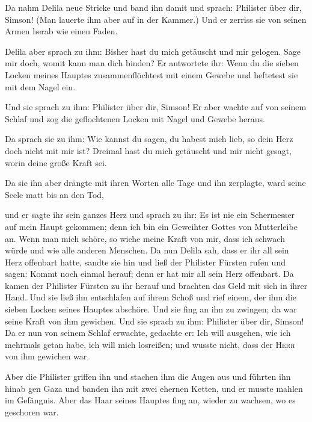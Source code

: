  Da nahm Delila neue Stricke und band ihn damit und
sprach: Philister über dir, Simson! (Man lauerte ihm aber auf in der
Kammer.) Und er zerriss sie von seinen Armen herab wie einen Faden.

 Delila aber sprach zu ihm: Bisher hast du mich getäuscht
und mir gelogen. Sage mir doch, womit kann man dich binden? Er
antwortete ihr: Wenn du die sieben Locken meines Hauptes
zusammenflöchtest mit einem Gewebe und heftetest sie mit dem Nagel ein.

 Und sie sprach zu ihm: Philister über dir, Simson! Er
aber wachte auf von seinem Schlaf und zog die geflochtenen Locken mit
Nagel und Gewebe heraus.

 Da sprach sie zu ihm: Wie kannst du sagen, du habest
mich lieb, so dein Herz doch nicht mit mir ist? Dreimal hast du mich
getäuscht und mir nicht gesagt, worin deine große Kraft sei.

 Da sie ihn aber drängte mit ihren Worten alle Tage und
ihn zerplagte, ward seine Seele matt bis an den Tod,

 und er sagte ihr sein ganzes Herz und sprach zu ihr: Es
ist nie ein Schermesser auf mein Haupt gekommen; denn ich bin ein
Geweihter Gottes von Mutterleibe an. Wenn man mich schöre, so wiche
meine Kraft von mir, dass ich schwach würde und wie alle anderen
Menschen.  Da nun Delila sah, dass er ihr all sein Herz
offenbart hatte, sandte sie hin und ließ der Philister Fürsten rufen und
sagen: Kommt noch einmal herauf; denn er hat mir all sein Herz
offenbart. Da kamen der Philister Fürsten zu ihr herauf und brachten das
Geld mit sich in ihrer Hand.  Und sie ließ ihn
entschlafen auf ihrem Schoß und rief einem, der ihm die sieben Locken
seines Hauptes abschöre. Und sie fing an ihn zu zwingen; da war seine
Kraft von ihm gewichen.  Und sie sprach zu ihm: Philister
über dir, Simson! Da er nun von seinem Schlaf erwachte, gedachte er: Ich
will ausgehen, wie ich mehrmals getan habe, ich will mich losreißen; und
wusste nicht, dass der \textsc{Herr} von ihm gewichen war.

 Aber die Philister griffen ihn und stachen ihm die Augen
aus und führten ihn hinab gen Gaza und banden ihn mit zwei ehernen
Ketten, und er musste mahlen im Gefängnis.  Aber das Haar
seines Hauptes fing an, wieder zu wachsen, wo es geschoren war.

